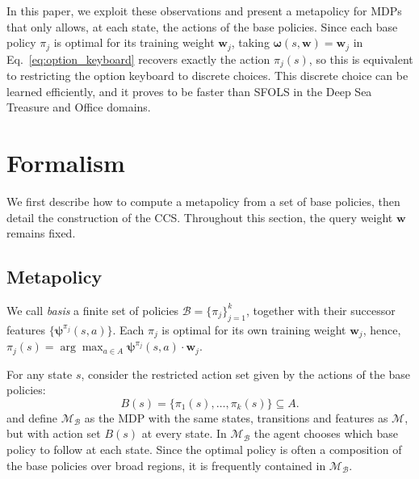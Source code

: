 \documentclass[11pt]{article}
\newcommand{\vpsi}{\bm{\psi}}      %
\newcommand{\vomega}{\bm{\omega}}  %
\begin{document}
In this paper, we exploit these observations and present a metapolicy for MDPs that only allows, at each state, the actions of the base policies. Since each base policy $\pi_j$ is optimal for its training weight $\mathbf{w}_j$, taking $\vomega(s, \mathbf{w}) = \mathbf{w}_j$ in Eq.~\eqref{eq:option_keyboard} recovers exactly the action $\pi_j(s)$, so this is equivalent to restricting the option keyboard to discrete choices. This discrete choice can be learned efficiently, and it proves to be faster than SFOLS in the Deep Sea Treasure and Office domains. %


\section{Formalism}\label{sec:Formalism}

We first describe how to compute a metapolicy from a set of base policies, then detail the construction of the CCS. Throughout this section, the query weight $\mathbf{w}$ remains fixed.

\subsection{Metapolicy}

We call \textit{basis} a finite set of policies $\mathcal{B} = \{\pi_j\}_{j=1}^k$, together with their successor features $\{\vpsi^{\pi_j}(s,a)\}$. Each $\pi_j$ is optimal for its own training weight $\mathbf{w}_j$, hence, $\pi_j(s) = \arg\max_{a \in A} \vpsi^{\pi_j}(s,a) \cdot \mathbf{w}_j$. 

For any state $s$, consider the restricted action set given by the actions of the base policies:
\begin{equation}
    B(s) = \{\pi_1(s), \dots, \pi_k(s)\} \subseteq A.
\end{equation}
and define $\mathcal{M}_{\mathcal{B}}$ as the MDP with the same states, transitions and features as $\mathcal{M}$, but with action set $B(s)$ at every state. In $\mathcal{M}_{\mathcal{B}}$ the agent chooses which base policy to follow at each state. Since the optimal policy is often a composition of the base policies over broad regions, it is frequently contained in $\mathcal{M}_{\mathcal{B}}$.
\end{document}
